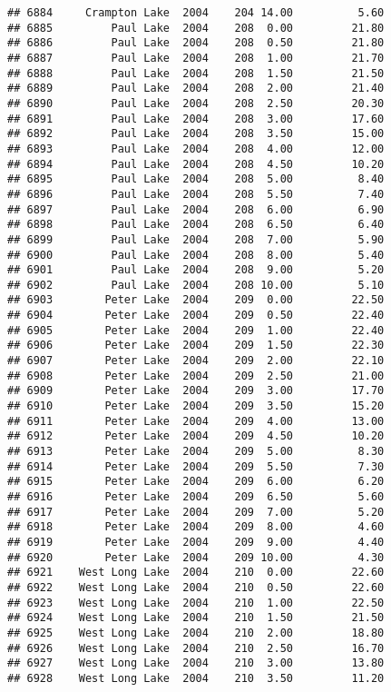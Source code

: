 \documentclass[
]{article}
\begin{document}
\begin{verbatim}
## 6884     Crampton Lake  2004    204 14.00          5.60
## 6885         Paul Lake  2004    208  0.00         21.80
## 6886         Paul Lake  2004    208  0.50         21.80
## 6887         Paul Lake  2004    208  1.00         21.70
## 6888         Paul Lake  2004    208  1.50         21.50
## 6889         Paul Lake  2004    208  2.00         21.40
## 6890         Paul Lake  2004    208  2.50         20.30
## 6891         Paul Lake  2004    208  3.00         17.60
## 6892         Paul Lake  2004    208  3.50         15.00
## 6893         Paul Lake  2004    208  4.00         12.00
## 6894         Paul Lake  2004    208  4.50         10.20
## 6895         Paul Lake  2004    208  5.00          8.40
## 6896         Paul Lake  2004    208  5.50          7.40
## 6897         Paul Lake  2004    208  6.00          6.90
## 6898         Paul Lake  2004    208  6.50          6.40
## 6899         Paul Lake  2004    208  7.00          5.90
## 6900         Paul Lake  2004    208  8.00          5.40
## 6901         Paul Lake  2004    208  9.00          5.20
## 6902         Paul Lake  2004    208 10.00          5.10
## 6903        Peter Lake  2004    209  0.00         22.50
## 6904        Peter Lake  2004    209  0.50         22.40
## 6905        Peter Lake  2004    209  1.00         22.40
## 6906        Peter Lake  2004    209  1.50         22.30
## 6907        Peter Lake  2004    209  2.00         22.10
## 6908        Peter Lake  2004    209  2.50         21.00
## 6909        Peter Lake  2004    209  3.00         17.70
## 6910        Peter Lake  2004    209  3.50         15.20
## 6911        Peter Lake  2004    209  4.00         13.00
## 6912        Peter Lake  2004    209  4.50         10.20
## 6913        Peter Lake  2004    209  5.00          8.30
## 6914        Peter Lake  2004    209  5.50          7.30
## 6915        Peter Lake  2004    209  6.00          6.20
## 6916        Peter Lake  2004    209  6.50          5.60
## 6917        Peter Lake  2004    209  7.00          5.20
## 6918        Peter Lake  2004    209  8.00          4.60
## 6919        Peter Lake  2004    209  9.00          4.40
## 6920        Peter Lake  2004    209 10.00          4.30
## 6921    West Long Lake  2004    210  0.00         22.60
## 6922    West Long Lake  2004    210  0.50         22.60
## 6923    West Long Lake  2004    210  1.00         22.50
## 6924    West Long Lake  2004    210  1.50         21.50
## 6925    West Long Lake  2004    210  2.00         18.80
## 6926    West Long Lake  2004    210  2.50         16.70
## 6927    West Long Lake  2004    210  3.00         13.80
## 6928    West Long Lake  2004    210  3.50         11.20

\end{verbatim}
\end{document}
